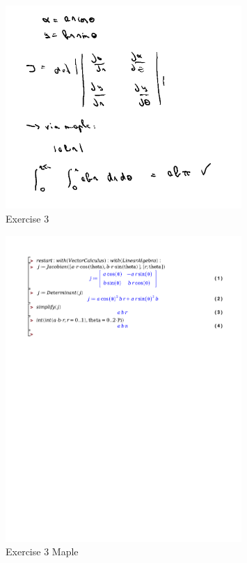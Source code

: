 \documentclass[a4paper]{article}
\begin{document}
\begin{figure}[H]
	\centering
	\includegraphics[width=0.8\textwidth]{assets/wc_5_ex_3.png}
	\caption{Exercise 3}
	\label{fig:wc_5_ex_3}
\end{figure}

\begin{figure}[H]
	\centering
	\includegraphics[width=0.8\textwidth]{exercises/wc_5_ex_3.pdf}
	\caption{Exercise 3 Maple}
	\label{fig:wc_5_ex_3_maple}
\end{figure}
\end{document}
